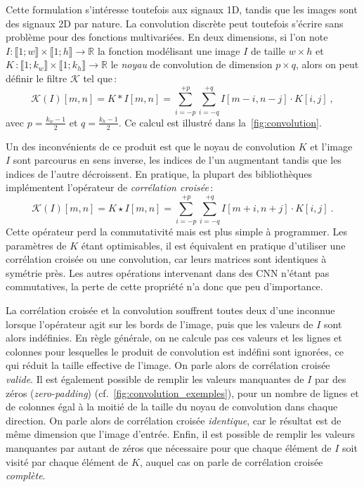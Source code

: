 Cette formulation s'intéresse toutefois aux signaux 1D, tandis que les images sont des signaux 2D par nature. La convolution discrète peut toutefois s'écrire sans problème pour des fonctions multivariées. En deux dimensions, si l'on note $I : \llbracket 1;w \rrbracket \times \llbracket 1;h \rrbracket \rightarrow \mathbb{R}$ la fonction modélisant une image $I$ de taille $w\times{}h$ et $K\,: \llbracket 1;k_w \rrbracket \times \llbracket 1;k_h \rrbracket \rightarrow \mathbb{R}$ le \emph{noyau} de convolution de dimension $p \times q$, alors on peut définir le filtre $\mathcal{K}$ tel que\,:
\begin{equation}
  \mathcal{K}(I)[m,n] = K * I [m,n] = \sum_{i=-p}^{+p} \sum_{i=-q}^{+q} I[m - i, n - j] \cdot K[i, j]~,
\end{equation}
avec $p = \frac{k_w-1}{2}$ et $q = \frac{k_h-1}{2}$. Ce calcul est illustré dans la~\cref{fig:convolution}.

Un des inconvénients de ce produit est que le noyau de convolution $K$ et l'image $I$ sont parcourus en sens inverse, les indices de l'un augmentant tandis que les indices de l'autre décroissent. En pratique, la plupart des bibliothèques implémentent l'opérateur de \emph{corrélation croisée}\,:
\begin{equation}
\mathcal{K}(I)[m,n] = K \star I [m, n] = \sum_{i=-p}^{+p} \sum_{i=-q}^{+q} I[m + i, n + j] \cdot K[i, j]~.
\end{equation}
Cette opérateur perd la commutativité mais est plus simple à programmer. Les paramètres de $K$ étant optimisables, il est équivalent en pratique d'utiliser une corrélation croisée ou une convolution, car leurs matrices sont identiques à symétrie près. Les autres opérations intervenant dans des \gls{CNN} n'étant pas commutatives, la perte de cette propriété n'a donc que peu d'importance.

La corrélation croisée et la convolution souffrent toutes deux d'une inconnue lorsque l'opérateur agit sur les bords de l'image, puis que les valeurs de $I$ sont alors indéfinies. En règle générale, on ne calcule pas ces valeurs et les lignes et colonnes pour lesquelles le produit de convolution est indéfini sont ignorées, ce qui réduit la taille effective de l'image. On parle alors de corrélation croisée \emph{valide}. Il est également possible de remplir les valeurs manquantes de $I$ par des zéros (\emph{zero-padding}) (cf.~\cref{fig:convolution_exemples}), pour un nombre de lignes et de colonnes égal à la moitié de la taille du noyau de convolution dans chaque direction. On parle alors de corrélation croisée \emph{identique}, car le résultat est de même dimension que l'image d'entrée. Enfin, il est possible de remplir les valeurs manquantes par autant de zéros que nécessaire pour que chaque élément de $I$ soit visité par chaque élément de $K$, auquel cas on parle de corrélation croisée \emph{complète}.

